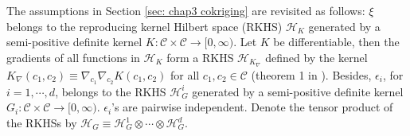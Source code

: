 The assumptions in Section \ref{sec: chap3 cokriging} are revisited as follows:
$\xi$ 
belongs to the reproducing kernel Hilbert space (RKHS) $\mathcal{H}_K$ generated by a
semi-positive definite
kernel $K: \mathcal{C}\times \mathcal{C} \rightarrow [0,\infty)$.
Let $K$ be differentiable, then the gradients of all functions in $\mathcal{H}_K$
form a RKHS $\mathcal{H}_{K_\nabla}$ defined by
the kernel $K_\nabla(c_1,c_2) \equiv \nabla_{c_1}\nabla_{c_2}K(c_1, c_2)$ 
for all $c_1,c_2\in \mathcal{C}$ (theorem 1 in \cite{derivative RKHS}).
Besides, $\epsilon_i$, for $i=1,\cdots, d$, belongs to the RKHS
$\mathcal{H}_{G}^i$ generated by a semi-positive definite
kernel $G_i: \mathcal{C}\times \mathcal{C} \rightarrow [0, \infty)$. $\epsilon_i$'s are pairwise
independent. 
Denote the tensor product of the RKHSs
by $\mathcal{H}_G \equiv \mathcal{H}_{G}^1 \otimes \cdots \otimes \mathcal{H}_G^d$.\\

